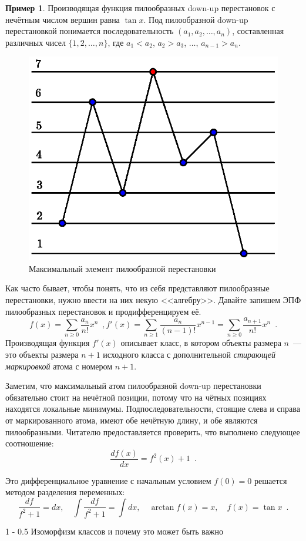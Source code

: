 \documentclass{article}
\makeatletter
\theoremstyle{definition}
\newtheorem{example}{Пример}
\renewcommand{\section}{\@startsection
{section}%
{1}%
{\z@}%
{-\baselineskip}%
{0.5\baselineskip}%
{\centering\large\scshape}} %
\makeatother
\begin{document}
\begin{example}
Производящая функция пилообразных down-up перестановок с нечётным числом вершин 
равна \( \tan x \). Под пилообразной down-up перестановкой понимается 
последовательность \( (a_1, a_2, \ldots, a_n) \), составленная различных чисел 
\( \{ 1, 2, \ldots, n \} \), где \( a_1 < a_2 \), \( a_2 > a_3 \), \( \ldots 
\), \( a_{n-1} > a_n \).

\begin{figure}[h]
\centering
	\includegraphics[width=.42\textwidth]{saw_permutation}
\caption{Максимальный элемент пилообразной перестановки}
\label{fig:saw_permutations}	
\end{figure}
	
Как часто бывает, чтобы понять, что из себя представляют пилообразные 
перестановки, нужно ввести на них некую <<алгебру>>. Давайте запишем ЭПФ 
пилообразных перестановок и продифференцируем её.
\[
	f(x) = \sum_{n \geq 0} \dfrac{a_n}{n!} x^n \enspace ,
	f'(x) = \sum_{n \geq 1} \dfrac{a_n}{(n-1)!} x^{n-1} = \sum_{n \geq 0} 
	\dfrac{a_{n+1}}{n!}x^{n}\enspace .
\]
Производящая функция \( f'(x) \) описывает класс, в котором объекты размера \( 
n \)~--- это объекты размера \( n+1 \) исходного класса с дополнительной 
\textit{стирающей маркировкой} атома с номером \( n+1 \). 

Заметим, что максимальный атом пилообразной down-up перестановки обязательно 
стоит на нечётной позиции, потому что на чётных позициях находятся локальные 
минимумы. Подпоследовательности, стоящие слева и справа от маркированного 
атома, имеют обе нечётную длину, и обе являются пилообразными. Читателю 
предоставляется проверить, что выполнено следующее соотношение:
\[
	\dfrac{df(x)}{dx} = f^2(x) + 1 \enspace .
\]
\end{example}
Это дифференциальное уравнение с начальным условием \( f(0) = 0 \) решается 
методом разделения переменных:
\[
	\dfrac{df}{f^2 + 1} = dx, \quad
	\int \dfrac{df}{f^2 + 1} = \int dx, \quad
	\arctan f(x) = x, \quad
	f(x) = \tan x \enspace .
\]

\section{Изоморфизм классов и почему это может быть важно}
\end{document}
